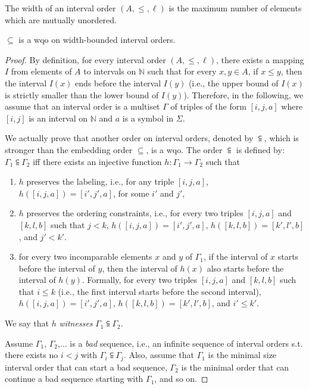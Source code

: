 The width of an interval order $(A,\leq,\ell)$ is the maximum number of elements which are mutually unordered.

\begin{lemma}
$\subseteq$ is a wqo on width-bounded interval orders.
\end{lemma}
\begin{proof}
By definition, for every interval order $(A,\leq,\ell)$, there exists a mapping $I$ from elements of $A$ to intervals on $\mathbb{N}$ such that for every $x,y\in A$, if $x\leq y$, then the interval $I(x)$ ends before the interval $I(y)$ (i.e., the upper bound of $I(x)$ is strictly smaller than the lower bound of $I(y)$). %
Therefore, in the following, we assume that an interval order is a multiset $\Gamma$ of triples of the form $[i,j,a]$ where $[i,j]$ is an interval on $\mathbb{N}$ and $a$ is a symbol in $\Sigma$.

We actually prove that another order on interval orders, denoted by $\subseteqq$, which is stronger than the embedding order $\subseteq$, is a wqo. The order $\subseteqq$ is defined by: $\Gamma_1\subseteqq \Gamma_2$ iff there exists an injective function $h:\Gamma_1\rightarrow \Gamma_2$ such that 
\begin{enumerate}
	\item $h$ preserves the labeling, i.e., for any triple $[i,j,a]$, $h([i,j,a])=[i',j',a]$, for some $i'$ and $j'$, 
	\item $h$ preserves the ordering constraints, i.e., for every two triples $[i,j,a]$ and $[k,l,b]$ such that $j< k$, $h([i,j,a])=[i',j',a]$, $h([k,l,b])=[k',l',b]$, and $j'< k'$.
	\item for every two incomparable elements $x$ and $y$ of $\Gamma_1$, if the interval of $x$ starts before the interval of $y$, then the interval of $h(x)$ also starts before the interval of $h(y)$. Formally, for every two triples $[i,j,a]$ and $[k,l,b]$ such that $i\leq k$ (i.e., the first interval starts before the second interval), $h([i,j,a])=[i',j',a]$, $h([k,l,b])=[k',l',b]$, and $i'\leq k'$.
\end{enumerate}
We say that $h$ \emph{witnesses} $\Gamma_1\subseteqq \Gamma_2$.
		
Assume $\Gamma_1$, $\Gamma_2$,$\ldots$ is a \emph{bad} sequence, i.e., an infinite sequence of interval orders s.t. there exists no $i < j$ with $\Gamma_i\subseteqq \Gamma_j$. Also, assume that $\Gamma_1$ is the minimal size interval order that can start a bad sequence, $\Gamma_2$ is the minimal order that can continue a bad sequence starting with $\Gamma_1$, and so on.


\end{proof}

